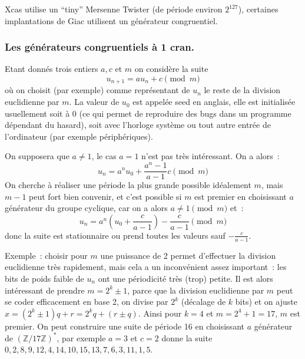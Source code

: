 \documentclass[a4paper,11pt]{article}
\newcommand{\Z}{{\mathbb{Z}}}
\begin{document}
\begin{giacjshere}
Xcas utilise un ``tiny'' Mersenne Twister (de période environ $2^{127}$),
certaines implantations de Giac utilisent un générateur congruentiel.

\subsubsection{Les générateurs congruentiels \`a 1 cran.}
Etant donnés trois entiers $a, c$ et $m$ on considère la suite
$$ u_{n+1}=au_n+c \pmod m $$
où on choisit (par exemple) comme représentant de $u_n$
le reste de la division euclidienne par $m$. La valeur de $u_0$
est appelée seed en anglais, elle est initialisée usuellement
soit à 0 (ce qui permet de reproduire des bugs dans un programme
dépendant du hasard), soit avec l'horloge système ou tout autre
entrée de l'ordinateur (par exemple périphériques).

On supposera que $a\neq 1$, le cas $a=1$ n'est pas tr\`es
int\'eressant. On a alors~:
$$ u_n=a^n u_0 + \frac{a^n-1}{a-1} c \pmod m$$
On cherche \`a r\'ealiser une p\'eriode la plus grande possible
id\'ealement $m$, mais $m-1$ peut fort bien convenir, et c'est
possible si $m$ est premier en choisissant 
$a$ g\'en\'erateur du groupe cyclique, car on a alors $a\neq 1 \pmod m$ et~:
$$ u_n=a^n (u_0 + \frac{c}{a-1}) - \frac{c}{a-1}  \pmod m$$
donc la suite est stationnaire ou prend toutes les valeurs sauf $- \frac{c}{a-1} $.

Exemple~: choisir pour $m$ une puissance de 2 permet d'effectuer
la division euclidienne tr\`es rapidement, mais cela a un
inconv\'enient assez important~: les bits de poids faible
de $u_n$ ont une p\'eriodicit\'e tr\`es (trop) petite.
Il est alors int\'eressant de prendre $m=2^k \pm 1$, parce
que la division euclidienne par $m$ peut se coder efficacement en base
2, on divise par $2^k$ (d\'ecalage de $k$ bits) et on ajuste
$x=(2^k \pm 1)q+r=2^k q + (r \pm q)$.
Ainsi pour $k=4$ et $m=2^4+1=17$, $m$ est premier.
On peut construire une suite de p\'eriode 16 en choisissant $a$ g\'en\'erateur
de $(\Z/17\Z)^*$, par exemple $a=3$ et $c=2$ donne la suite
$0,2,8,9,12,4,14,10,15,13,7,6,3,11,1,5$.


\end{giacjshere}
\end{document}
